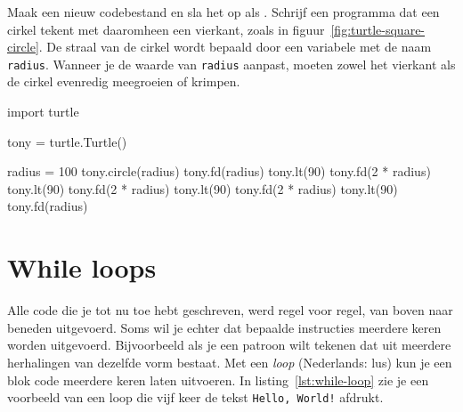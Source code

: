 \documentclass[../main]{subfiles}
\begin{document}
\begin{opgave}[icons={laptop}]
\begin{minipage}[t]{0.6\textwidth}
\raggedright
Maak een nieuw codebestand en sla het op als .
Schrijf een programma dat een cirkel tekent met daaromheen een vierkant, zoals in figuur~\ref{fig:turtle-square-circle}. De straal van de cirkel wordt bepaald door een variabele met de naam \texttt{radius}. Wanneer je de waarde van \texttt{radius} aanpast, moeten zowel het vierkant als de cirkel evenredig meegroeien of krimpen.
\end{minipage}%
\hfill%
\begin{minipage}[t]{0.3\textwidth}
%
\label{fig:turtle-square-circle}
\end{minipage}


\end{opgave}
\begin{antwoord}
\begin{python-breakable}[style=mu-noframe]
import turtle

tony = turtle.Turtle()

radius = 100
tony.circle(radius)
tony.fd(radius)
tony.lt(90)
tony.fd(2 * radius)
tony.lt(90)
tony.fd(2 * radius)
tony.lt(90)
tony.fd(2 * radius)
tony.lt(90)
tony.fd(radius)
\end{python-breakable}
\end{antwoord}
\section{While loops}%
\label{sec:while-loops}

Alle code die je tot nu toe hebt geschreven, werd regel voor regel, van boven naar beneden uitgevoerd. Soms wil je echter dat bepaalde instructies meerdere keren worden uitgevoerd. Bijvoorbeeld als je een patroon wilt tekenen dat uit meerdere herhalingen van dezelfde vorm bestaat. Met een \emph{loop} (Nederlands: lus) kun je een blok code meerdere keren laten uitvoeren. In listing~\ref{lst:while-loop} zie je een voorbeeld van een loop die vijf keer de tekst \texttt{Hello, World!} afdrukt.
\end{document}
